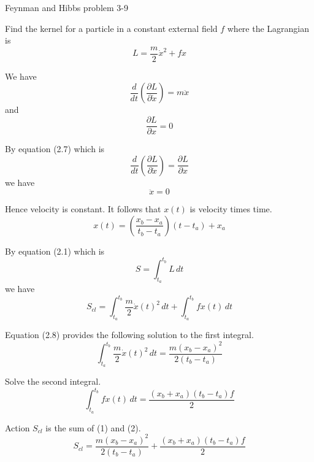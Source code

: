 \documentclass[12pt]{article}
\begin{document}
Feynman and Hibbs problem 3-9


\bigskip
Find the kernel for a particle in a constant external field $f$
where the Lagrangian is
\begin{equation*}
L=\frac{m}{2}\dot x^2+fx
\end{equation*}


We have
\begin{equation*}
\frac{d}{dt}\left(\frac{\partial L}{\partial\dot x}\right)=m\ddot x
\end{equation*}
and
\begin{equation*}
\frac{\partial L}{\partial x}=0
\end{equation*}

\noindent
By equation (2.7) which is
\begin{equation*}
\frac{d}{dt}\left(\frac{\partial L}{\partial\dot x}\right)=\frac{\partial L}{\partial x}
\end{equation*}
we have
\begin{equation*}
\ddot x=0
\end{equation*}

\noindent
Hence velocity is constant. It follows that $x(t)$ is velocity times time.
\begin{equation*}
x(t)=\left(\frac{x_b-x_a}{t_b-t_a}\right)(t-t_a)+x_a
\end{equation*}

\noindent
By equation (2.1) which is
\begin{equation*}
S=\int_{t_a}^{t_b} L\,dt
\end{equation*}
we have
\begin{equation*}
S_{cl}=\int_{t_a}^{t_b}\frac{m}{2}\dot x(t)^2\,dt
+\int_{t_a}^{t_b}fx(t)\,dt
\end{equation*}


Equation (2.8) provides the following solution to the first integral.
\begin{equation*}
\int_{t_a}^{t_b}\frac{m}{2}\dot x(t)^2\,dt
=\frac{m(x_b-x_a)^2}{2(t_b-t_a)}
\tag{1}
\end{equation*}


Solve the second integral.
\begin{equation*}
\int_{t_a}^{t_b}fx(t)\,dt=\frac{(x_b+x_a)(t_b-t_a)f}{2}
\tag{2}
\end{equation*}


Action $S_{cl}$ is the sum of (1) and (2).
\begin{equation*}
S_{cl}=\frac{m(x_b-x_a)^2}{2(t_b-t_a)}+\frac{(x_b+x_a)(t_b-t_a)f}{2}
\end{equation*}
\end{document}
